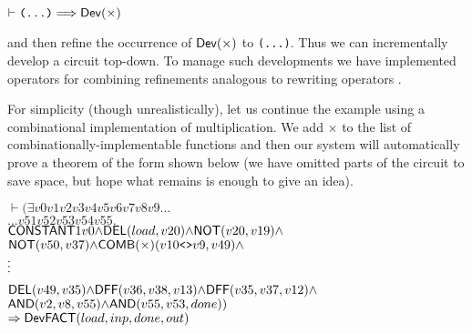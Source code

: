 \documentclass{llncs}
\begin{document}
\vspace*{-2mm}

{\baselineskip10pt\begin{alltt}
\( \vdash \texttt{(...)} \Longrightarrow \DEF{Dev}({\times}) \)
\end{alltt}}

\vspace*{-2mm}

\noindent and then refine the occurrence of $\mathsf{Dev}(\times)$
to \texttt{(...)}.  Thus we can incrementally develop a
circuit top-down. To manage such developments we have
implemented operators for combining refinements analogous to rewriting
operators \cite{paulson83}.

For simplicity (though unrealistically), let us continue the example
using a combinational implementation of multiplication. We add
${\times}$ to the list of combinationally-implementable functions and
then our system will automatically prove a theorem of the form shown
below (we have omitted parts of the circuit to save space, but hope
what remains is enough to give an idea).

\vspace*{-2mm}

{\baselineskip10pt\begin{alltt}
\( \vdash ({\exists}v0 v1 v2 v3 v4 v5 v6 v7 v8 v9 ...                                             \)
\(      ... v51 v52 v53 v54 v55.                                                                       \)
\(     \DEF{CONSTANT} 1 v0 {\wedge} \DEF{DEL}(load,v20) {\wedge} \DEF{NOT}(v20,v19) {\wedge}       \)
\(     \DEF{NOT}(v50,v37) {\wedge} \DEF{COMB}({\times})(v10\texttt{<>}v9,v49) {\wedge}                     \)
      \(\raisebox{3mm}{\vdots}\)
\(     \DEF{DEL}(v49,v35) {\wedge} \DEF{DFF}(v36,v38,v13) {\wedge} \DEF{DFF}(v35,v37,v12) {\wedge} \)
\(     \DEF{AND}(v2,v8,v55) {\wedge} \DEF{AND}(v55,v53,done))                                     \)
\(    \Rightarrow \DEF{Dev} \DEF{FACT} (load,inp,done,out)                                         \)
\end{alltt}}

\vspace*{-2mm}
\end{document}
